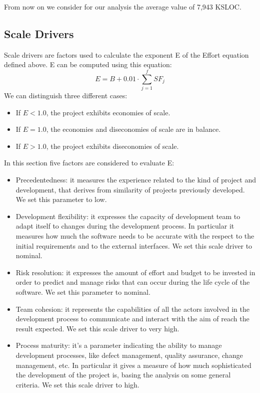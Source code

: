 From now on we consider for our analysis the average value of 7,943 KSLOC.

\subsection{Scale Drivers}
Scale drivers are factors used to calculate the exponent E of the Effort equation defined above.
E can be computed using this equation:
\[ E = B + 0.01 \cdot \sum_{j=1}^fSF_j \]
We can distinguish three different cases:
\begin{itemize}
\item If \( E < 1.0 \), the project exhibits economies of scale.
\item If \( E = 1.0 \), the economies and diseconomies of scale are in balance.
\item If \( E > 1.0 \), the project exhibits diseconomies of scale.
\end{itemize}

In this section five factors are considered to evaluate E:
\begin{itemize}
\item Precedentedness: it measures the experience related to the kind of project and development, that derives from similarity of projects previously developed.
We set this parameter to low.
\item Development flexibility: it expresses the capacity of development team to adapt itself to changes during the development process.
In particular it measures how much the software needs to be accurate with the respect to the initial requirements and to the external interfaces.
We set this scale driver to nominal.
\item Risk resolution: it expresses the amount of effort and budget to be invested in order to predict and manage risks that can occur during the life cycle of the software.
We set this parameter to nominal.
\item Team cohesion: it represents the capabilities of all the actors involved in the development process to communicate and interact with the aim of reach the result expected.
We set this scale driver to very high.
\item Process maturity: it’s a parameter indicating the ability to manage development processes, like defect management, quality assurance, change management, etc.
In particular it gives a measure of how much sophisticated the development of the project is, basing the analysis on some general criteria.
We set this scale driver to high.
\end{itemize}


